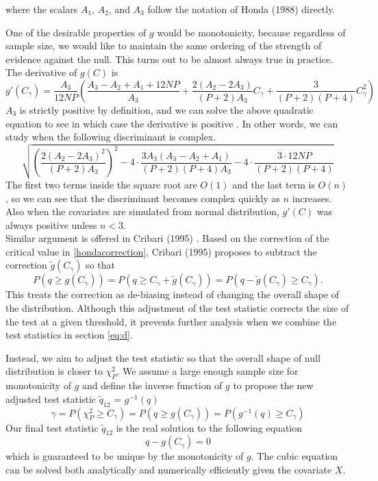 \documentclass[aoas,preprint]{imsart}
\numberwithin{equation}{section}
\theoremstyle{plain}
\begin{document}
 where the scalars $A_1$, $A_2$, and $A_3$ follow the notation of Honda (1988) directly. 

\vspace{5mm}  
One of the desirable properties of $g$ would be monotonicity, because regardless of sample size, we would like to maintain the same ordering of the strength of evidence against the null. This turns out to be almost always true in practice. The derivative of $g(C)$ is 
$$g'(C_{\gamma}) = \frac{A_3}{12NP}\left( \frac{A_3-A_2+A_1+12NP}{A_3} + 
 \frac{2(A_2-2A_3)}{(P+2)A_3}C_{\gamma} + \frac{3}{(P+2)(P+4)}C_{\gamma}^2 \right)$$
 $A_3$ is strictly positive by definition, and we can solve the above quadratic equation to see in which case the derivative is positive \cite{cribari1995improved}. In other words, we can study when the following discriminant is complex.
$$\sqrt{\left(\frac{2(A_2-2A_3)^2}{(P+2)A_3}\right)^2 - 4\cdot\frac{3A_3(A_3-A_2+A_1)}{(P+2)(P+4)A_3} - 4\cdot
\frac{3 \cdot 12NP}{(P+2)(P+4)}}$$
The first two terms inside the square root are $O(1)$ and the last term is $O(n)$, so we can see that the discriminant becomes complex quickly as $n$ increases. Also when the covariates are simulated from normal distribution, $g'(C)$ was always positive unless $n<3$. \\


Similar argument is offered in Cribari (1995) \cite{cribari1995improved}. Based on the correction of the critical value in \ref{hondacorrection}, Cribari (1995) proposes to subtract the correction $\tilde{g}(C_{\gamma})$ so that
$$P(q  \geq g(C_{\gamma})) = P(q \geq C_{\gamma} + \tilde{g}(C_{\gamma})) = P(q - \tilde{g}(C_{\gamma}) \geq C_{\gamma}).$$
This treats the correction as de-biasing instead of changing the overall shape of the distribution. Although this adjustment of the test statistic corrects the size of the test at a given threshold, it prevents further analysis when we combine the test statistics in section \ref{eq:d}.

\vspace{5mm} 
Instead, we aim to adjust the test statistic so that the overall shape of null distribution is closer to $\chi_{P}^2$. We assume a large enough sample size for monotonicity of $g$ and define the inverse function of $g$ to propose the new adjusted test statistic $\tilde{q}_{12}$ = $g^{-1}(q)$
$$\gamma = P(\chi_{P}^2 \geq C_{\gamma}) = P(q \geq g(C_{\gamma})) = P(g^{-1}(q) \geq C_{\gamma})$$
Our final test statistic $\tilde{q}_{12}$ is the real solution to the following equation 
$$q - g(C_{\gamma}) = 0$$
which is guaranteed to be unique by the monotonicity of $g$. The cubic equation can be solved both analytically and numerically efficiently given the covariate $X$. 




\end{document}
